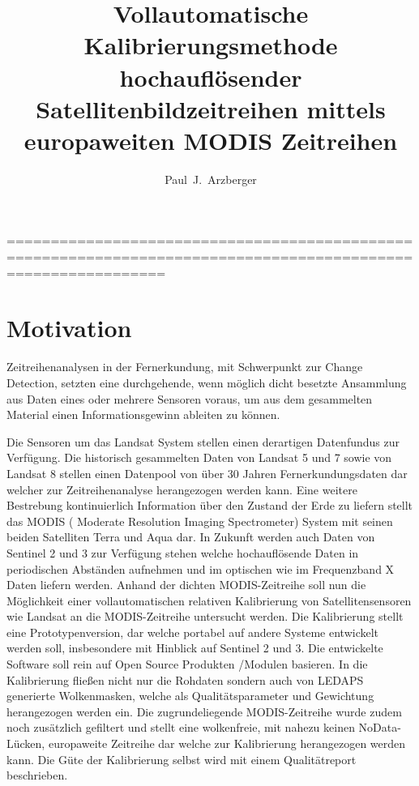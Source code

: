 \documentclass[11pt]{report}
\author{Paul~J.~Arzberger}
\title{Vollautomatische Kalibrierungsmethode hochauflösender Satellitenbildzeitreihen mittels europaweiten MODIS Zeitreihen}
\begin{document}
\maketitle

\tableofcontents
% 
% 
==============================================================================================================
\chapter{Motivation}

Zeitreihenanalysen in der Fernerkundung, mit Schwerpunkt zur Change Detection, setzten eine durchgehende, wenn möglich dicht besetzte Ansammlung aus Daten eines oder mehrere Sensoren voraus, um aus dem gesammelten Material einen Informationsgewinn ableiten zu können.


Die Sensoren um das Landsat System stellen einen derartigen Datenfundus zur Verfügung. Die historisch gesammelten Daten von Landsat 5 und 7 sowie von Landsat 8 stellen einen Datenpool von über 30 Jahren Fernerkundungsdaten dar welcher zur Zeitreihenanalyse herangezogen werden kann. 
 Eine weitere Bestrebung kontinuierlich Information über den Zustand der Erde zu liefern stellt das MODIS ( Moderate Resolution Imaging Spectrometer) System mit seinen beiden Satelliten Terra und Aqua dar. In Zukunft werden auch Daten von Sentinel 2 und 3 zur Verfügung stehen welche hochauflösende Daten in periodischen Abständen aufnehmen und im optischen wie im Frequenzband X Daten liefern werden. Anhand der dichten MODIS-Zeitreihe soll nun die Möglichkeit einer vollautomatischen relativen Kalibrierung von Satellitensensoren wie Landsat an die MODIS-Zeitreihe untersucht werden. Die Kalibrierung  stellt eine Prototypenversion, dar welche portabel auf andere Systeme entwickelt werden soll, insbesondere mit Hinblick auf Sentinel 2 und 3. Die entwickelte Software soll rein auf Open Source Produkten /Modulen basieren. In die Kalibrierung fließen nicht nur die Rohdaten sondern auch von LEDAPS generierte Wolkenmasken, welche als Qualitätsparameter und Gewichtung herangezogen werden ein. Die zugrundeliegende MODIS-Zeitreihe wurde zudem noch zusätzlich gefiltert und stellt eine wolkenfreie, mit nahezu keinen NoData-Lücken, europaweite Zeitreihe dar welche zur Kalibrierung herangezogen werden kann. Die Güte der Kalibrierung selbst wird mit einem Qualitätreport beschrieben. 
\end{document}
